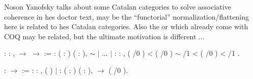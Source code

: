     Noson Yanofsky talks about some Catalan categories to solve associative coherence in hes doctor text, may be the ``functorial'' normalization/flattening here is related to hes Catalan categories. Also the   or  which already come with COQ may be related, but the ultimate motivation is different ... \begin{coqdoccode}
\coqdocemptyline
\end{coqdoccode}
\vspace{-.15in} \coqdoceol
\coqdocemptyline
\coqdocnoindent
{}  : \coqdockw{\ensuremath{\forall}}   : ,    \ensuremath{\rightarrow}    \ensuremath{\rightarrow} \coqdoceol
\coqdocindent{0.50em}
:=  : \coqdockw{\ensuremath{\forall}} (  : ) ( :   ),  \ensuremath{\sim} \coqdoceol
\coqdocindent{0.50em}
\ensuremath{|} ...\coqdoceol
\coqdocindent{0.50em}
\ensuremath{|}  : \coqdockw{\ensuremath{\forall}}     : ,\coqdoceol
\coqdocindent{1.50em}
 ( /0 )   <    ( /0 ) \ensuremath{\sim}\coqdoceol
\coqdocindent{1.50em}
    /1   <   ( /0 )  <\coqdoceol
\coqdocindent{1.50em}
  /1    .

\coqdocemptyline
\begin{coqdoccode}
\end{coqdoccode}
\vspace{-.15in} \coqdoceol
\coqdocemptyline
\coqdocnoindent
{}  :  \ensuremath{\rightarrow}  :=\coqdoceol
\coqdocnoindent
{} : \coqdockw{\ensuremath{\forall}}  : ,  ( )\coqdoceol
\coqdocnoindent
\ensuremath{|}  : \coqdockw{\ensuremath{\forall}} ( : ) ( : ),   \ensuremath{\rightarrow}  ( /0  ).

